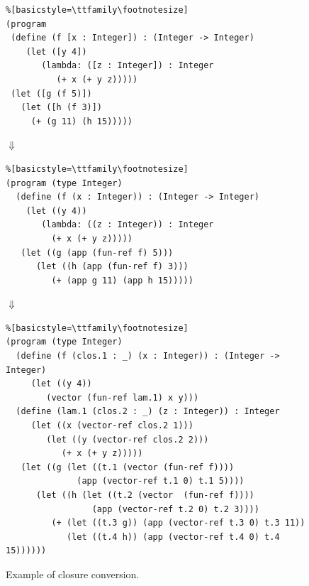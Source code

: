 \documentclass[11pt]{book}
\begin{document}
\begin{figure}[h]
\begin{minipage}{0.8\textwidth}
\begin{lstlisting}%[basicstyle=\ttfamily\footnotesize]
(program
 (define (f [x : Integer]) : (Integer -> Integer)
    (let ([y 4])
       (lambda: ([z : Integer]) : Integer
          (+ x (+ y z)))))
 (let ([g (f 5)])
   (let ([h (f 3)])
     (+ (g 11) (h 15)))))
\end{lstlisting}
$\Downarrow$
\begin{lstlisting}%[basicstyle=\ttfamily\footnotesize]
(program (type Integer)
  (define (f (x : Integer)) : (Integer -> Integer)
    (let ((y 4))
       (lambda: ((z : Integer)) : Integer
         (+ x (+ y z)))))
   (let ((g (app (fun-ref f) 5)))
      (let ((h (app (fun-ref f) 3)))
         (+ (app g 11) (app h 15)))))
\end{lstlisting}
$\Downarrow$
\begin{lstlisting}%[basicstyle=\ttfamily\footnotesize]
(program (type Integer)
  (define (f (clos.1 : _) (x : Integer)) : (Integer -> Integer)
     (let ((y 4))
        (vector (fun-ref lam.1) x y)))
  (define (lam.1 (clos.2 : _) (z : Integer)) : Integer
     (let ((x (vector-ref clos.2 1)))
        (let ((y (vector-ref clos.2 2)))
           (+ x (+ y z)))))
   (let ((g (let ((t.1 (vector (fun-ref f))))
              (app (vector-ref t.1 0) t.1 5))))
      (let ((h (let ((t.2 (vector  (fun-ref f))))
                 (app (vector-ref t.2 0) t.2 3))))
         (+ (let ((t.3 g)) (app (vector-ref t.3 0) t.3 11))
            (let ((t.4 h)) (app (vector-ref t.4 0) t.4 15))))))
\end{lstlisting}
\end{minipage}

\caption{Example of closure conversion.}
\label{fig:lexical-functions-example}
\end{figure}
\end{document}
